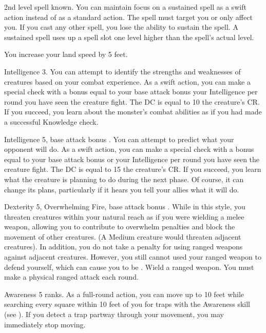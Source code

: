 \featpre 2nd level spell known.
\featben You can maintain focus on a sustained spell as a swift action instead of as a standard action.
The spell must target you or only affect you.
If you cast any other spell, you lose the ability to sustain the spell.
A sustained spell uses up a spell slot one level higher than the spell's actual level.

\featben You increase your land speed by 5 feet.

\featpre Intelligence 3.
\featben You can attempt to identify the strengths and weaknesses of creatures based on your combat experience.
As a swift action, you can make a special check with a bonus equal to your base attack bonus \add your Intelligence  per round you have seen the creature fight.
The DC is equal to 10 \add the creature's CR.
If you succeed, you learn about the monster's combat abilities as if you had made a successful Knowledge check.

\featpres Intelligence 5, base attack bonus .
\featben You can attempt to predict what your opponent will do.
As a swift action, you can make a special check with a bonus equal to your base attack bonus or your Intelligence  per round you have seen the creature fight.
The DC is equal to 15 \add the creature's CR.
If you succeed, you learn what the creature is planning to do during the next phase.
Of course, it can change its plans, particularly if it hears you tell your allies what it will do.

\featpres Dexterity 5, Overwhelming Fire, base attack bonus .
\featben While in this style, you threaten creatures within your natural reach as if you were wielding a melee weapon, allowing you to contribute to overwhelm penalties and block the movement of other creatures.
(A Medium creature would threaten adjacent creatures).
In addition, you do not take a  penalty for using ranged weapons against adjacent creatures.
However, you still cannot used your ranged weapon to defend yourself, which can cause you to be .
\stylereq Wield a ranged weapon.
You must make a physical ranged attack each round.

\featpre Awareness 5 ranks.
\featben As a full-round action, you can move up to 10 feet while searching every square within 10 feet of you for traps with the Awareness skill (see ).
If you detect a trap partway through your movement, you may immediately stop moving.

